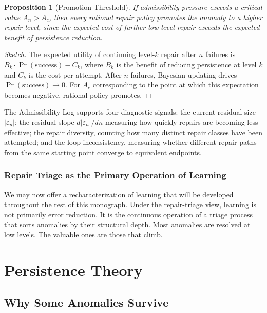 \documentclass[12pt,oneside]{book}
\theoremstyle{plain}
\newtheorem{proposition}[theorem]{Proposition}
\theoremstyle{definition}
\theoremstyle{remark}
\newcommand{\eps}{\varepsilon}
\newcommand{\1}{\mathbf{1}}
\begin{document}
\begin{proposition}[Promotion Threshold]
\label{prop:threshold}
If admissibility pressure exceeds a critical value $A_n > A_c$, then every rational repair policy promotes the anomaly to a higher repair level, since the expected cost of further low-level repair exceeds the expected benefit of persistence reduction.
\end{proposition}

\begin{proof}[Sketch]
The expected utility of continuing level-$k$ repair after $n$ failures is $B_k \cdot \Pr(\text{success}) - C_k$, where $B_k$ is the benefit of reducing persistence at level $k$ and $C_k$ is the cost per attempt. After $n$ failures, Bayesian updating drives $\Pr(\text{success}) \to 0$. For $A_c$ corresponding to the point at which this expectation becomes negative, rational policy promotes.
\end{proof}

The Admissibility Log supports four diagnostic signals: the current residual size $|\eps_n|$; the residual slope $d|\eps_n|/dn$ measuring how quickly repairs are becoming less effective; the repair diversity, counting how many distinct repair classes have been attempted; and the loop inconsistency, measuring whether different repair paths from the same starting point converge to equivalent endpoints.

\section{Repair Triage as the Primary Operation of Learning}

We may now offer a recharacterization of learning that will be developed throughout the rest of this monograph. Under the repair-triage view, learning is not primarily error reduction. It is the continuous operation of a triage process that sorts anomalies by their structural depth. Most anomalies are resolved at low levels. The valuable ones are those that climb.

\part{Persistence Theory}

\chapter{Why Some Anomalies Survive}
\end{document}
